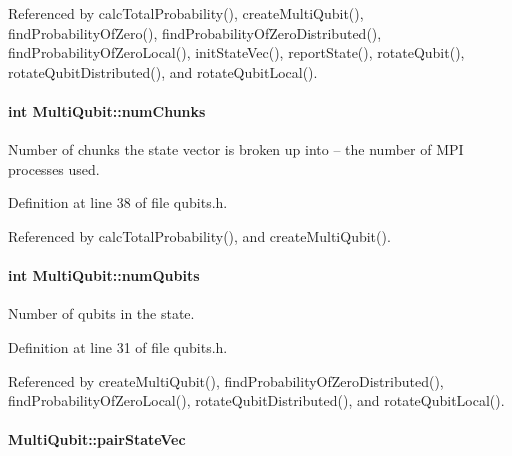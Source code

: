 Referenced by calc\+Total\+Probability(), create\+Multi\+Qubit(), find\+Probability\+Of\+Zero(), find\+Probability\+Of\+Zero\+Distributed(), find\+Probability\+Of\+Zero\+Local(), init\+State\+Vec(), report\+State(), rotate\+Qubit(), rotate\+Qubit\+Distributed(), and rotate\+Qubit\+Local().

\paragraph[{\texorpdfstring{num\+Chunks}{numChunks}}]{\setlength{\rightskip}{0pt plus 5cm}int Multi\+Qubit\+::num\+Chunks}\hypertarget{structMultiQubit_acd43f2f57991709c9e94f73662c972b2}{}\label{structMultiQubit_acd43f2f57991709c9e94f73662c972b2}


Number of chunks the state vector is broken up into -- the number of M\+PI processes used. 



Definition at line 38 of file qubits.\+h.



Referenced by calc\+Total\+Probability(), and create\+Multi\+Qubit().

\paragraph[{\texorpdfstring{num\+Qubits}{numQubits}}]{\setlength{\rightskip}{0pt plus 5cm}int Multi\+Qubit\+::num\+Qubits}\hypertarget{structMultiQubit_ab5b9795bdc6fb5855e1974dcbbaeb36f}{}\label{structMultiQubit_ab5b9795bdc6fb5855e1974dcbbaeb36f}


Number of qubits in the state. 



Definition at line 31 of file qubits.\+h.



Referenced by create\+Multi\+Qubit(), find\+Probability\+Of\+Zero\+Distributed(), find\+Probability\+Of\+Zero\+Local(), rotate\+Qubit\+Distributed(), and rotate\+Qubit\+Local().

\paragraph[{\texorpdfstring{pair\+State\+Vec}{pairStateVec}}]{ Multi\+Qubit\+::pair\+State\+Vec}\hypertarget{structMultiQubit_a76f7db4eab52d2b30f58f973ada809c5}{}\label{structMultiQubit_a76f7db4eab52d2b30f58f973ada809c5}


